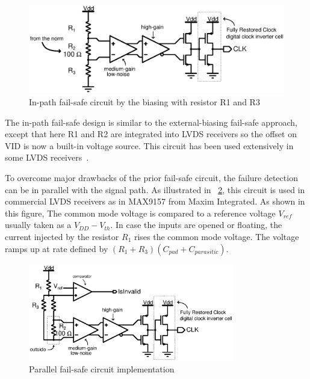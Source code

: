 \begin{figure}[htp]
    \centering
    \includegraphics[width=\textwidth]{Chapter5/Figs/adc_chip/lvds-external-failsafe.ps}
    \caption{In-path fail-safe circuit by the biasing with resistor R1 and R3}
    \label{fig:in-path-fail-safe}
\end{figure}


The in-path fail-safe design is similar to the external-biasing fail-safe approach, except that here R1 and R2 are integrated into LVDS receivers so the offset on VID is now a built-in voltage source. This circuit has been used extensively in some LVDS receivers~\cite{TI-SLLA082B}.

To overcome major drawbacks of the prior fail-safe circuit, the failure detection can be in parallel with the signal path. As illustrated in \figurename~\ref{fig:parallel-fail-safe}, this circuit is used in commercial LVDS receivers as in MAX9157 from Maxim Integrated. As shown in this figure, The common mode voltage is compared to a reference voltage $V_{ref}$ usually taken as a $V_{DD}-V_{th}$. In case the inputs are opened or floating, the current injected by the resistor $R_1$ rises the common mode voltage. The voltage ramps up at rate defined by $(R_1+R_3)(C_{pad}+C_{parasitic})$.

\begin{figure}[htp]
    \centering
    \includegraphics[width=0.8\textwidth]{Chapter5/Figs/adc_chip/lvds-parallel-failsafe.ps}
    \caption{Parallel fail-safe circuit implementation}
    \label{fig:parallel-fail-safe}
\end{figure}

